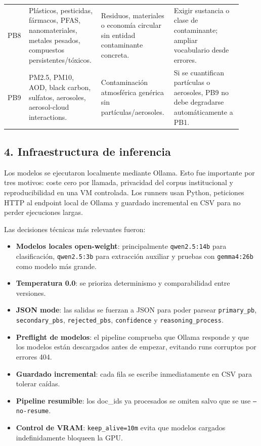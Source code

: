\begin{center}
\begin{tabular}{p{0.08\linewidth}p{0.27\linewidth}p{0.28\linewidth}p{0.29\linewidth}}
PB8 & Plásticos, pesticidas, fármacos, PFAS, nanomateriales, metales pesados, compuestos persistentes/tóxicos. & Residuos, materiales o economía circular sin entidad contaminante concreta. & Exigir sustancia o clase de contaminante; ampliar vocabulario desde errores. \\
PB9 & PM2.5, PM10, AOD, black carbon, sulfatos, aerosoles, aerosol-cloud interactions. & Contaminación atmosférica genérica sin partículas/aerosoles. & Si se cuantifican partículas o aerosoles, PB9 no debe degradarse automáticamente a PB1. \\
\bottomrule
\end{tabular}
\end{center}

\subsection{4. Infraestructura de inferencia}

Los modelos se ejecutaron localmente mediante Ollama. Esto fue importante por tres motivos: coste cero por llamada, privacidad del corpus institucional y reproducibilidad en una VM controlada. Los runners usan Python, peticiones HTTP al endpoint local de Ollama y guardado incremental en CSV para no perder ejecuciones largas.

Las decisiones técnicas más relevantes fueron:

\begin{itemize}
\item \textbf{Modelos locales open-weight}: principalmente \texttt{qwen2.5:14b} para clasificación, \texttt{qwen2.5:3b} para extracción auxiliar y pruebas con \texttt{gemma4:26b} como modelo más grande.
\item \textbf{Temperatura 0.0}: se prioriza determinismo y comparabilidad entre versiones.
\item \textbf{JSON mode}: las salidas se fuerzan a JSON para poder parsear \texttt{primary\_pb}, \texttt{secondary\_pbs}, \texttt{rejected\_pbs}, \texttt{confidence} y \texttt{reasoning\_process}.
\item \textbf{Preflight de modelos}: el pipeline comprueba que Ollama responde y que los modelos están descargados antes de empezar, evitando runs corruptos por errores 404.
\item \textbf{Guardado incremental}: cada fila se escribe inmediatamente en CSV para tolerar caídas.
\item \textbf{Pipeline resumible}: los doc\_ids ya procesados se omiten salvo que se use \texttt{--no-resume}.
\item \textbf{Control de VRAM}: \texttt{keep\_alive=10m} evita que modelos cargados indefinidamente bloqueen la GPU.
\end{itemize}

